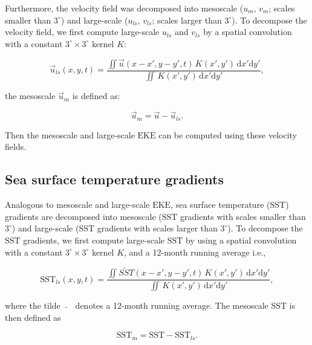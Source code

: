\documentclass{nature}
\newcommand\ddfrac[2]{\frac{\displaystyle #1}{\displaystyle #2}}
\newcommand{\EKE}{\text{EKE}}
\newcommand{\SST}{\text{SST}}
\begin{document}
Furthermore, the velocity field was decomposed into mesoscale ($u_{m}$, $v_{m}$; scales smaller than $3^\circ$) and large-scale ($u_{ls}$, $v_{ls}$; scales larger than $3^\circ$). To decompose the velocity field, we first compute large-scale $u_{ls}$ and  $v_{ls}$ by a spatial convolution with a constant  $3^\circ\times 3^\circ$ kernel $K$:

\begin{linenomath*}
\begin{equation}
	\vec{u}_{ls}(x, y, t) = \ddfrac{\iint \vec{u}(x-x', y-y', t)\, K(x', y')\,\mathrm{d}x'\mathrm{d}y'}{\iint\,K(x',y')\,\mathrm{d}x'\mathrm{d}y'},
\end{equation}
\end{linenomath*}
the mesoscale $\vec{u}_m$ is defined as:
\begin{linenomath*}
\begin{equation}
	\vec{u}_{m} = \vec{u} - \vec{u}_{ls}.
\end{equation}
\end{linenomath*}
Then the mesoscale and large-scale $\EKE$ can be computed using these velocity fields.

\subsection{Sea surface temperature gradients}\mbox{}\vspace{-1.5em}

Analogous to mesoscale and large-scale $\EKE$, sea surface temperature ($\SST$) gradients are decomposed into mesoscale ($\SST$ gradients with scales smaller than $3^\circ$) and large-scale ($\SST$ gradients with scales larger than $3^\circ$). To decompose the $\SST$ gradients, we first compute large-scale $\SST$ by using a spatial convolution with a constant $3^\circ\times 3^\circ$ kernel $K$, and a 12-month running average i.e.,
\begin{linenomath*}
\begin{equation}
	\SST_{ls}(x, y, t) = \ddfrac{\iint \widetilde{SST}(x-x', y-y', t)\, K(x', y')\,\mathrm{d}x'\mathrm{d}y'}{\iint\,K(x',y')\,\mathrm{d}x'\mathrm{d}y'},
\end{equation}
\end{linenomath*}
where the tilde $\widetilde{\ \ \ \ \ }$ denotes a 12-month running average. The mesoscale $\SST$ is then defined as
\begin{linenomath*}
\begin{equation}
    \SST_{m} = \SST - \SST_{ls} .
\end{equation}
\end{linenomath*}
\end{document}
